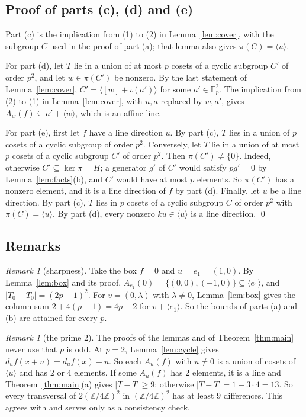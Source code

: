 \documentclass[11pt]{amsart}
\theoremstyle{definition}\newtheorem{definition}[theorem]{Definition}
\theoremstyle{remark}\newtheorem{remark}[theorem]{Remark}
\newcommand{\F}{\mathbb{F}}
\newcommand{\Z}{\mathbb{Z}}
\newcommand{\abs}[1]{\lvert #1\rvert}
\newcommand{\gen}[1]{\langle #1\rangle}
\begin{document}
\subsection{Proof of parts (c), (d) and (e)}
Part (c) is the implication from (1) to (2) in Lemma~\ref{lem:cover}, with the subgroup \(C\) used in the proof of part (a); that lemma also gives \(\pi(C)=\gen{u}\).

For part (d), let \(T\) lie in a union of at most \(p\) cosets of a cyclic subgroup \(C'\) of order \(p^2\), and let \(w\in\pi(C')\) be nonzero.
By the last statement of Lemma~\ref{lem:cover}, \(C'=\gen{[w]+\iota(a')}\) for some \(a'\in\F_p^2\).
The implication from (2) to (1) in Lemma~\ref{lem:cover}, with \(u,a\) replaced by \(w,a'\), gives \(A_w(f)\subseteq a'+\gen{w}\), which is an affine line.

For part (e), first let \(f\) have a line direction \(u\).
By part (c), \(T\) lies in a union of \(p\) cosets of a cyclic subgroup of order \(p^2\).
Conversely, let \(T\) lie in a union of at most \(p\) cosets of a cyclic subgroup \(C'\) of order \(p^2\).
Then \(\pi(C')\ne\{0\}\).
Indeed, otherwise \(C'\subseteq\ker\pi=H\); a generator \(g'\) of \(C'\) would satisfy \(pg'=0\) by Lemma~\ref{lem:facts}(b), and \(C'\) would have at most \(p\) elements.
So \(\pi(C')\) has a nonzero element, and it is a line direction of \(f\) by part (d).
Finally, let \(u\) be a line direction.
By part (c), \(T\) lies in \(p\) cosets of a cyclic subgroup \(C\) of order \(p^2\) with \(\pi(C)=\gen{u}\).
By part (d), every nonzero \(ku\in\gen{u}\) is a line direction.
\qed

\subsection{Remarks}

\begin{remark}[sharpness]\label{rem:sharp}
Take the box \(f=0\) and \(u=e_1=(1,0)\).
By Lemma~\ref{lem:box} and its proof, \(A_{e_1}(0)=\{(0,0),(-1,0)\}\subseteq\gen{e_1}\), and \(\abs{T_0-T_0}=(2p-1)^2\).
For \(v=(0,\lambda)\) with \(\lambda\ne0\), Lemma~\ref{lem:box} gives the column sum \(2+4(p-1)=4p-2\) for \(v+\gen{e_1}\).
So the bounds of parts (a) and (b) are attained for every \(p\).
\end{remark}

\begin{remark}[the prime \(2\)]\label{rem:p2}
The proofs of the lemmas and of Theorem~\ref{thm:main} never use that \(p\) is odd.
At \(p=2\), Lemma~\ref{lem:cycle} gives \(d_uf(x+u)=d_uf(x)+u\).
So each \(A_u(f)\) with \(u\ne0\) is a union of cosets of \(\gen{u}\) and has \(2\) or \(4\) elements.
If some \(A_u(f)\) has \(2\) elements, it is a line and Theorem~\ref{thm:main}(a) gives \(\abs{T-T}\ge9\); otherwise \(\abs{T-T}=1+3\cdot4=13\).
So every transversal of \(2(\Z/4\Z)^2\) in \((\Z/4\Z)^2\) has at least \(9\) differences.
This agrees with \cite[Corollary~5.2]{BPT} and serves only as a consistency check.
\end{remark}
\end{document}
